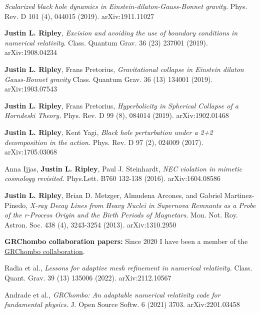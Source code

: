 \documentclass{my_cv}
\begin{document}
\begin{etaremune}
   \emph{Scalarized black hole dynamics in
      Einstein-dilaton-Gauss-Bonnet gravity}.
   Phys. Rev. D 101 (4), 044015 (2019).
   arXiv:1911.11027
\item {\bf Justin L. Ripley}, 
   \emph{Excision and avoiding the use of boundary conditions
      in numerical relativity}.
   Class. Quantum Grav. 36 (23) 237001 (2019).  
   arXiv:1908.04234
\item {\bf Justin L. Ripley}, Frans Pretorius, 
   \emph{Gravitational collapse in Einstein
      dilaton Gauss-Bonnet gravity}
   Class. Quantum Grav. 36 (13) 134001 (2019).
   arXiv:1903.07543
\item {\bf Justin L. Ripley}, Frans Pretorius, 
   \emph{Hyperbolicity in Spherical Collapse of a Horndeski Theory.}
   Phys. Rev. D 99 (8), 084014 (2019).
   arXiv:1902.01468
\item {\bf Justin L. Ripley}, Kent Yagi, 
   \emph{Black hole perturbation under a 2+2 decomposition
      in the action.}
   Phys. Rev. D 97 (2), 024009 (2017).
   arXiv:1705.03068
\item Anna Ijjas, {\bf Justin L. Ripley}, Paul J. Steinhardt,
   \emph{NEC violation in mimetic cosmology revisited.}
   Phys.Lett. B760 132-138 (2016).
   arXiv:1604.08586
\item {\bf Justin L. Ripley}, Brian D. Metzger,	
      Almudena Arcones, and Gabriel Martinez-Pinedo,
   \emph{X-ray Decay Lines from Heavy Nuclei in
      Supernova Remnants as a Probe of the r-Process Origin
      and the Birth Periods of Magnetars.}
   Mon. Not. Roy. Astron. Soc. 438 (4), 3243-3254 (2013).
   arXiv:1310.2950
\end{etaremune}

{\bf GRChombo collaboration papers:} Since 2020 I have been a member of the 
\href{https://www.grchombo.org/}{GRChombo collaboration}.
\begin{etaremune}
\item Radia et al., 
   \emph{Lessons for adaptive mesh refinement in numerical relativity.}
    Class. Quant. Grav. 39 (13) 135006 (2022).
    arXiv:2112.10567

\item Andrade et al.,
   \emph{GRChombo: An adaptable numerical relativity code for fundamental physics.}
   J. Open Source Softw. 6 (2021) 3703. 
   arXiv:2201.03458

\end{etaremune}
\end{document}
